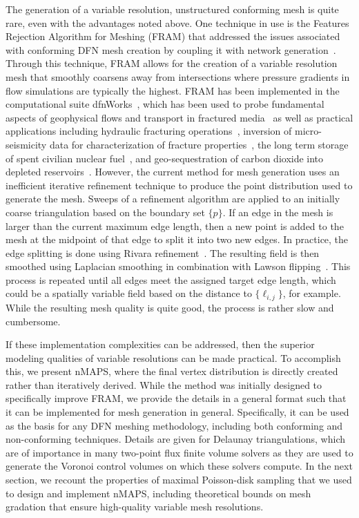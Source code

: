 \documentclass[preprint, 10pt]{elsarticle}
\theoremstyle{definition}
\theoremstyle{remark}
\begin{document}
The generation of a variable resolution, unstructured conforming mesh is quite rare, even with the advantages noted above. 
One technique in use is the Features Rejection Algorithm for Meshing ({\sc FRAM}) that addressed the issues associated with conforming DFN mesh creation by coupling it with network generation~\cite{hyman2014conforming}. 
Through this technique, {\sc FRAM} allows for the creation of a variable resolution mesh that smoothly coarsens away from intersections where pressure gradients in flow simulations are typically the highest. 
{\sc FRAM} has been implemented in the computational suite {\sc dfnWorks}~\cite{hyman2015dfnWorks}, which has been used to probe fundamental aspects of geophysical flows and transport in fractured media~\cite{hyman2020flow,hyman2019emergence,hyman2019matrix,kang2020anomalous,makedonska2016evaluating,sherman2020characterizing} as well as practical applications including hydraulic fracturing operations~\cite{hyman2017discontinuities,karra2015effect,lovell2018extracting}, inversion of micro-seismicity data for characterization of fracture properties~\cite{mudunuru2017sequential}, the long term storage of spent civilian nuclear fuel~\cite{hadgu2017comparative}, and geo-sequestration of carbon dioxide into depleted reservoirs~\cite{hyman2020characterizing}.
However, the current method for mesh generation uses an inefficient iterative refinement technique to produce the point distribution used to generate the mesh. 
Sweeps of a refinement algorithm are applied to an initially coarse triangulation based on the boundary set $\{p\}$.
If an edge in the mesh is larger than the current maximum edge length, then a new point is added to the mesh at the midpoint of that edge to split it into two new edges. 
In practice, the edge splitting is done using Rivara refinement~\cite{rivara1984algorithms,rivara1984mesh}.
The resulting field is then smoothed using Laplacian smoothing in combination with Lawson flipping~\cite{khamayseh1996anisotropic}. 
This process is repeated until all edges meet the assigned target edge length, which could be a spatially variable field based on the distance to  $\{\ell_{i,j}\}$, for example.
While the resulting mesh quality is quite good, the process is rather slow and cumbersome. 


If these implementation complexities can be addressed, then the superior modeling qualities of variable resolutions can be made practical.
To accomplish this, we present nMAPS, where the final vertex distribution is directly created rather than iteratively derived. 
While the method was initially designed to specifically improve {\sc FRAM}, we provide the details in a general format such that it can be implemented for mesh generation in general.
Specifically, it can be used as the basis for any DFN meshing methodology,  including both conforming and non-conforming techniques. 
Details are given for Delaunay triangulations, which are of importance in many two-point flux finite volume solvers as they are used to generate the Voronoi control volumes on which these solvers compute.  
In the next section, we recount the properties of maximal Poisson-disk sampling that we used to design and implement nMAPS, including theoretical bounds on mesh gradation that ensure high-quality variable mesh resolutions.
\end{document}
